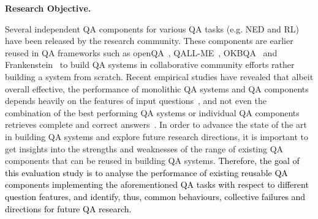 \documentclass[sigconf,edbt]{acmart-edbt2019}
\begin{document}
\noindent
{\bf Research Objective.} \begin{inparaenum}
Several independent QA components for various QA tasks (e.g. NED and RL) have been released by the research community. These components are earlier reused in QA frameworks such as openQA~\cite{openqa}, QALL-ME~\cite{qallme}, OKBQA~\cite{kim2016open} and Frankenstein~\cite{DBLP:conf/esws/SinghBRS18} to build QA systems in collaborative community efforts rather building a system from scratch. Recent empirical studies have revealed that albeit overall effective, the performance of monolithic QA systems and QA components depends heavily on the features of input questions~\cite{saleemquestion,DBLP:conf/www/SinghRBSLUVKP0V18}, and not even the combination of the best performing QA systems or individual QA components retrieves complete and correct answers~\cite{DBLP:journals/pvldb/CuiXWSHW17}. In order to advance the state of the art in building QA systems and explore future research directions, it is important to get insights into the strengths and weaknesses of the range of existing QA components that can be reused in building QA systems. \textcolor{black}{Therefore, the goal of this evaluation study is to analyse the performance of existing reusable QA components implementing the aforementioned QA tasks with respect to different question features, and identify, thus, common behaviours, collective failures and directions for future QA research.}
\end{inparaenum}
~\\
\end{document}
